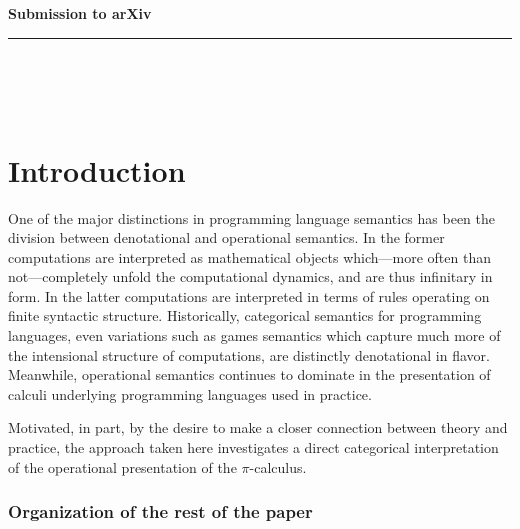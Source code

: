 \documentclass[]{acm_proc_article-sp}
\numberwithin{equation}{subsection}
\newcommand{\pic}{$\pi$-calculus}
\newcommand{\paperversion}{Draft Version 0.1 - Jan 7, 2015}
\newenvironment{toc}
{
\begin{list}{}{
   \setlength{\leftmargin}{0.4in}
   \setlength{\rightmargin}{0.6in}
   \setlength{\parskip}{0pt}
 } \item }
{\end{list}}
\begin{document}
\noindent
{\large \textbf{Submission to arXiv}}\\
\rule{6.25in}{0.75pt}\\\\\\

\maketitle




\section{Introduction}

One of the major distinctions in programming language semantics has
been the division between denotational and operational semantics. In
the former computations are interpreted as mathematical objects 
which---more often than not---completely unfold the computational
dynamics, and are thus infinitary in form. In the latter computations
are interpreted in terms of rules operating on finite syntactic
structure. Historically, categorical semantics for programming
languages, even variations such as games semantics which capture much
more of the intensional structure of computations, are distinctly
denotational in flavor. Meanwhile, operational semantics continues to
dominate in the presentation of calculi underlying programming
languages used in practice.

Motivated, in part, by the desire to make a closer connection between
theory and practice, the approach taken here investigates a direct
categorical interpretation of the operational presentation of the
{\pic}.

\subsubsection{Organization of the rest of the paper}
\end{document}
